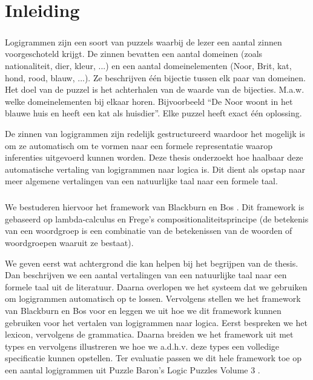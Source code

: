 \chapter{Inleiding}
\paragraph{} Logigrammen zijn een soort van puzzels waarbij de lezer een aantal zinnen voorgeschoteld krijgt. De zinnen bevatten een aantal domeinen (zoals nationaliteit, dier, kleur, ...) en een aantal domeinelementen (Noor, Brit, kat, hond, rood, blauw, ...). Ze beschrijven één bijectie tussen elk paar van domeinen. Het doel van de puzzel is het achterhalen van de waarde van de bijecties. M.a.w. welke domeinelementen bij elkaar horen. Bijvoorbeeld ``De Noor woont in het blauwe huis en heeft een kat als huisdier''. Elke puzzel heeft exact één oplossing.

De zinnen van logigrammen zijn redelijk gestructureerd waardoor het mogelijk is om ze automatisch om te vormen naar een formele representatie waarop inferenties uitgevoerd kunnen worden. Deze thesis onderzoekt hoe haalbaar deze automatische vertaling van logigrammen naar logica is. Dit dient als opstap naar meer algemene vertalingen van een natuurlijke taal naar een formele taal.

\paragraph{} We bestuderen hiervoor het framework van Blackburn en Bos \cite{Blackburn2005, Blackburn2006}. Dit framework is gebaseerd op lambda-calculus en Frege's compositionaliteitsprincipe (de betekenis van een woordgroep is een combinatie van de betekenissen van de woorden of woordgroepen waaruit ze bestaat).

We geven eerst wat achtergrond die kan helpen bij het begrijpen van de thesis. Dan beschrijven we een aantal vertalingen van een natuurlijke taal naar een formele taal uit de literatuur. Daarna overlopen we het systeem dat we gebruiken om logigrammen automatisch op te lossen. Vervolgens stellen we het framework van Blackburn en Bos voor en leggen we uit hoe we dit framework kunnen gebruiken voor het vertalen van logigrammen naar logica. Eerst bespreken we het lexicon, vervolgens de grammatica. Daarna breiden we het framework uit met types en vervolgens illustreren we hoe we a.d.h.v. deze types een volledige specificatie kunnen opstellen. Ter evaluatie passen we dit hele framework toe op een aantal logigrammen uit Puzzle Baron's Logic Puzzles Volume 3 \cite{logigrammen}.
